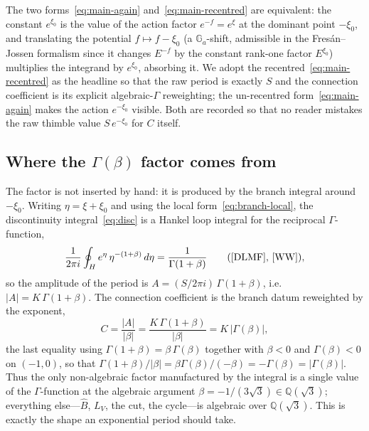 \documentclass[11pt,reqno]{amsart}
\theoremstyle{plain}
\theoremstyle{definition}
\newcommand{\Bhat}{\widehat{B}}
\newcommand{\LV}{L_{V}}
\newcommand{\Qsqrt}{\mathbb{Q}(\sqrt3)}
\newcommand{\xizero}{\xi_0}
\providecommand{\C}{}\renewcommand{\C}{C}
\begin{document}
The two forms~\eqref{eq:main-again} and~\eqref{eq:main-recentred} are equivalent: the constant
$e^{\xizero}$ is the value of the action factor $e^{-f}=e^{\xi}$ at the dominant point $-\xizero$,
and translating the potential $f\mapsto f-\xizero$ (a $\mathbb{G}_a$-shift, admissible in the
Fres\'an--Jossen formalism since it changes $E^{-f}$ by the constant rank-one factor
$E^{\xizero}$) multiplies the integrand by $e^{\xizero}$, absorbing it. We adopt the
recentred~\eqref{eq:main-recentred} as the headline so that the raw period is exactly $S$ and the
connection coefficient is its explicit algebraic-$\Gamma$ reweighting; the un-recentred
form~\eqref{eq:main-again} makes the action $e^{-\xizero}$ visible. Both are recorded so that no
reader mistakes the raw thimble value $S\,e^{-\xizero}$ for $\C$ itself.

\subsection{Where the \texorpdfstring{$\Gamma(\beta)$}{Gamma(beta)} factor comes from}
The factor is not inserted by hand: it is produced by the branch integral around $-\xizero$.
Writing $\eta=\xi+\xizero$ and using the local form~\eqref{eq:branch-local}, the discontinuity
integral~\eqref{eq:disc} is a Hankel loop integral for the reciprocal $\Gamma$-function,
\begin{equation}\label{eq:hankel-gamma}
  \frac{1}{2\pi i}\oint_{H}e^{\eta}\,\eta^{-(1+\beta)}\,d\eta=\frac{1}{\Gamma(1+\beta)}
  \qquad(\text{\cite[\S5.9]{DLMF}, \cite[\S12.22]{WW}}),
\end{equation}
so the amplitude of the period is $A=(S/2\pi i)\,\Gamma(1+\beta)$, i.e.
$\lvert A\rvert=K\,\Gamma(1+\beta)$. The connection coefficient is the branch datum reweighted by
the exponent,
\begin{equation}\label{eq:C-from-A}
  \C=\frac{\lvert A\rvert}{\lvert\beta\rvert}=\frac{K\,\Gamma(1+\beta)}{\lvert\beta\rvert}
   =K\,\lvert\Gamma(\beta)\rvert ,
\end{equation}
the last equality using $\Gamma(1+\beta)=\beta\,\Gamma(\beta)$ together with $\beta<0$ and
$\Gamma(\beta)<0$ on $(-1,0)$, so that $\Gamma(1+\beta)/\lvert\beta\rvert
=\beta\Gamma(\beta)/(-\beta)=-\Gamma(\beta)=\lvert\Gamma(\beta)\rvert$. Thus the only
non-algebraic factor manufactured by the
integral is a single value of the $\Gamma$-function at the algebraic argument
$\beta=-1/(3\sqrt3)\in\Qsqrt$; everything else---$\Bhat$, $\LV$, the cut, the cycle---is algebraic
over $\Qsqrt$. This is exactly the shape an exponential period should take.
\end{document}
